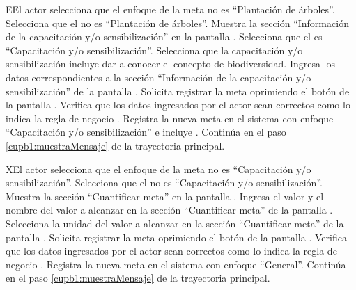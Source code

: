 \begin{UCtrayectoriaA}{E}{El actor selecciona que el enfoque de la meta no es ``Plantación de árboles''.}
	\UCpaso[\UCactor] Selecciona que el  no es ``Plantación de árboles''. 
	\UCpaso[\UCsist] Muestra la sección ``Información de la capacitación y/o sensibilización'' en la pantalla .
	\UCpaso[\UCactor] Selecciona que el  es ``Capacitación y/o sensibilización''. 
	\UCpaso[\UCactor] Selecciona que la capacitación y/o sensibilización incluye dar a conocer el concepto de biodiversidad. 
	\UCpaso[\UCactor] Ingresa los datos correspondientes a la sección ``Información de la capacitación y/o sensibilización'' de la pantalla .
	\UCpaso[\UCactor] Solicita registrar la meta oprimiendo el botón  de la pantalla .  
	\UCpaso[\UCsist] Verifica que los datos ingresados por el actor sean correctos como lo indica la regla de negocio .   
	\UCpaso[\UCsist] Registra la nueva meta en el sistema con enfoque ``Capacitación y/o sensibilización'' e incluye .
	\UCpaso[] Continúa en el paso \ref{cupb1:muestraMensaje} de la trayectoria principal.
\end{UCtrayectoriaA}


\begin{UCtrayectoriaA}{X}{El actor selecciona que el enfoque de la meta no es ``Capacitación y/o sensibilización''.}
	\UCpaso[\UCactor] Selecciona que el  no es ``Capacitación y/o sensibilización''. 
	\UCpaso[\UCsist] Muestra la sección ``Cuantificar meta'' en la pantalla .
	\UCpaso[\UCactor] Ingresa el valor y el nombre del valor a alcanzar en la sección ``Cuantificar meta'' de la pantalla .
	\UCpaso[\UCactor] Selecciona la unidad del valor a alcanzar en la sección ``Cuantificar meta'' de la pantalla . 
	\UCpaso[\UCactor] Solicita registrar la meta oprimiendo el botón  de la pantalla .  
	\UCpaso[\UCsist] Verifica que los datos ingresados por el actor sean correctos como lo indica la regla de negocio .   
	\UCpaso[\UCsist] Registra la nueva meta en el sistema con enfoque ``General''.
	\UCpaso[] Continúa en el paso \ref{cupb1:muestraMensaje} de la trayectoria principal.
\end{UCtrayectoriaA}

